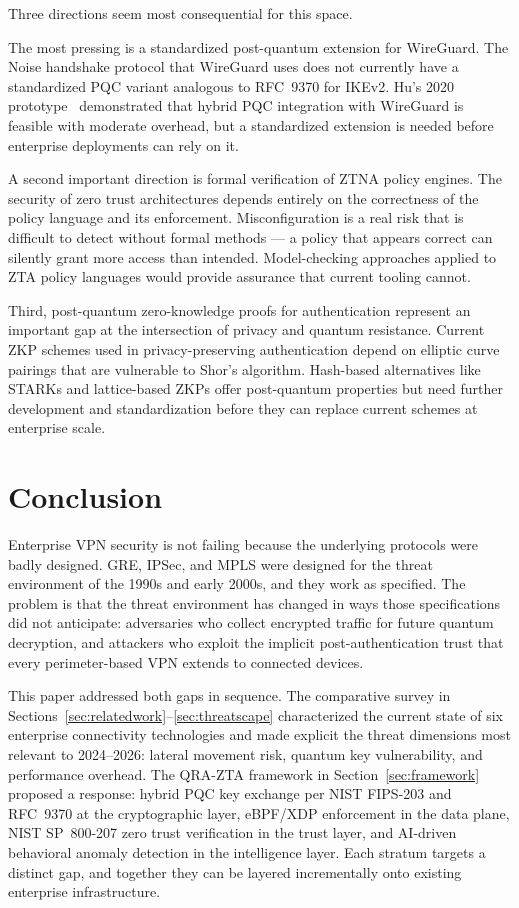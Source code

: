 \documentclass[conference]{IEEEtran}
\begin{document}
Three directions seem most consequential for this space.

The most pressing is a standardized post-quantum extension for
WireGuard. The Noise handshake protocol that WireGuard uses
does not currently have a standardized PQC variant analogous
to RFC~9370 for IKEv2. Hu's 2020 prototype~\cite{hu2020pq}
demonstrated that hybrid PQC integration with WireGuard is
feasible with moderate overhead, but a standardized extension
is needed before enterprise deployments can rely on it.

A second important direction is formal verification of ZTNA
policy engines. The security of zero trust architectures
depends entirely on the correctness of the policy language
and its enforcement. Misconfiguration is a real risk that is
difficult to detect without formal methods --- a policy that
appears correct can silently grant more access than intended.
Model-checking approaches applied to ZTA policy languages
would provide assurance that current tooling cannot.

Third, post-quantum zero-knowledge proofs for authentication
represent an important gap at the intersection of privacy and
quantum resistance. Current ZKP schemes used in privacy-preserving
authentication depend on elliptic curve pairings that are
vulnerable to Shor's algorithm. Hash-based alternatives like
STARKs and lattice-based ZKPs offer post-quantum properties
but need further development and standardization before they
can replace current schemes at enterprise scale.

\section{Conclusion}
\label{sec:conclusion}

Enterprise VPN security is not failing because the underlying
protocols were badly designed. GRE, IPSec, and MPLS were
designed for the threat environment of the 1990s and early
2000s, and they work as specified. The problem is that the
threat environment has changed in ways those specifications
did not anticipate: adversaries who collect encrypted traffic
for future quantum decryption, and attackers who exploit the
implicit post-authentication trust that every perimeter-based
VPN extends to connected devices.

This paper addressed both gaps in sequence. The comparative
survey in Sections~\ref{sec:relatedwork}--\ref{sec:threatscape}
characterized the current state of six enterprise connectivity
technologies and made explicit the threat dimensions most
relevant to 2024--2026: lateral movement risk, quantum key
vulnerability, and performance overhead. The QRA-ZTA framework
in Section~\ref{sec:framework} proposed a response: hybrid
PQC key exchange per NIST FIPS-203 and RFC~9370 at the
cryptographic layer, eBPF/XDP enforcement in the data plane,
NIST SP~800-207 zero trust verification in the trust layer,
and AI-driven behavioral anomaly detection in the intelligence
layer. Each stratum targets a distinct gap, and together they
can be layered incrementally onto existing enterprise
infrastructure.
\end{document}
